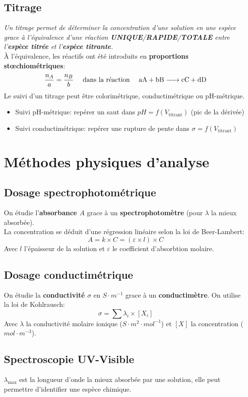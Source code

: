 \documentclass[a5paper,10pt]{article}
\begin{document}
\subsection{Titrage}
\textit{Un titrage permet de déterminer la concentration d'une solution en une espèce grace à l'équivalence d'une réaction \textbf{UNIQUE}/\textbf{RAPIDE}/\textbf{TOTALE} entre l'\textbf{espèce titrée} et l'\textbf{espèce titrante}.}\\
À l'équivalence, les réactifs ont été introduits en \textbf{proportions stœchiométriques}:
$$\frac{n_A}{a}=\frac{n_B}{b} \quad\text{ dans la réaction }\quad\ce{aA + bB -> cC + dD}$$
Le suivi d'un titrage peut être colorimétrique, conductimétrique ou pH-métrique.
\begin{itemize}[noitemsep]
    \item Suivi pH-métrique: repérer un saut dans $pH=f(V_{\text{titrant}})$ (pic de la dérivée)
    \item Suivi conductimétrique: repérer une rupture de pente dans $\sigma=f(V_{\text{titrant}})$
\end{itemize}

\section{Méthodes physiques d'analyse}
\subsection{Dosage spectrophotométrique}
On étudie l'\textbf{absorbance $A$} grace à un \textbf{spectrophotomètre} (pour $\lambda$ la mieux absorbée).\\
La concentration se déduit d'une régression linéaire selon la loi de Beer-Lambert:
$$A=k\times C=(\varepsilon \times l)\times C$$
Avec $l$ l'épaisseur de la solution et $\varepsilon$ le coefficient d'absorbtion molaire.

\subsection{Dosage conductimétrique}
On étudie la \textbf{conductivité $\sigma$} en $S\cdot m^{-1}$ grace à un \textbf{conductimètre}.
On utilise la loi de Kohlrausch:
$$\sigma=\sum\lambda_i\times [X_i]$$
Avec $\lambda$ la conductivité molaire ionique ($S\cdot m^2\cdot mol^{-1}$) et $[X]$ la concentration ($mol\cdot m^{-3}$).

\vspace{0.1em}
\subsection{Spectroscopie UV-Visible}
$\lambda_{\text{max}}$ est la longueur d'onde la mieux absorbée par une solution, elle peut permettre d'identifier une espèce chimique.
\end{document}
